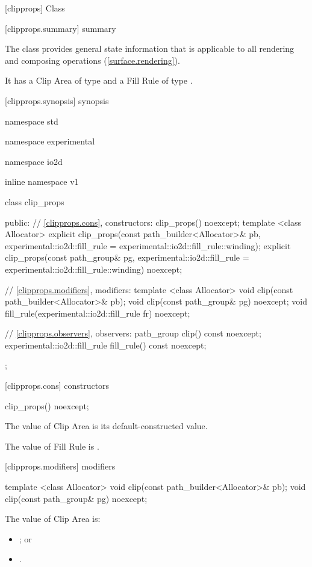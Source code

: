 
 [clipprops] {Class }

 [clipprops.summary] { summary}

\pnum
The  class provides general state information that is applicable to all rendering and composing operations (\ref{surface.rendering}).

\pnum
It has a Clip Area of type  and a Fill Rule of type .

 [clipprops.synopsis] { synopsis}

\begin{codeblock}
namespace std { namespace experimental { namespace io2d { inline namespace v1 {
  class clip_props {
  public:
    // \ref{clipprops.cons}, constructors:
    clip_props() noexcept;
    template <class Allocator>
    explicit clip_props(const path_builder<Allocator>& pb,
      experimental::io2d::fill_rule = experimental::io2d::fill_rule::winding);
    explicit clip_props(const path_group& pg, experimental::io2d::fill_rule =
      experimental::io2d::fill_rule::winding) noexcept;

    // \ref{clipprops.modifiers}, modifiers:
    template <class Allocator>
    void clip(const path_builder<Allocator>& pb);
    void clip(const path_group& pg) noexcept;
    void fill_rule(experimental::io2d::fill_rule fr) noexcept;
    
    // \ref{clipprops.observers}, observers:
    path_group clip() const noexcept;
    experimental::io2d::fill_rule fill_rule() const noexcept;
  };
}}}}
\end{codeblock}

 [clipprops.cons] { constructors}

\begin{itemdecl}
clip_props() noexcept;
\end{itemdecl}
\begin{itemdescr}
\pnum
\effects
The value of Clip Area is its default-constructed value.

\pnum
The value of Fill Rule is .
\end{itemdescr}

 [clipprops.modifiers] { modifiers}

\begin{itemdecl}
template <class Allocator>
void clip(const path_builder<Allocator>& pb);
void clip(const path_group& pg) noexcept;
\end{itemdecl}
\begin{itemdescr}
\pnum
\effects
The value of Clip Area is:
\begin{itemize}
\item {}; or
\item {}.
\end{itemize}
\end{itemdescr}

